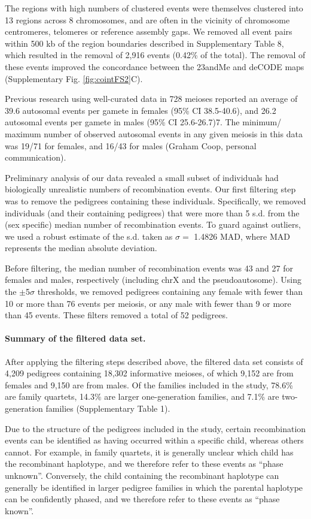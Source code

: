 The regions with high numbers of clustered events were themselves clustered
into 13 regions across 8 chromosomes, and are often in the vicinity of chromosome
centromeres, telomeres or reference assembly gaps. We removed all event pairs
within 500 kb of the region boundaries described in Supplementary Table 8, which
resulted in the removal of 2,916 events (0.42\% of the total). The removal of these
events improved the concordance between the 23andMe and deCODE maps
(Supplementary Fig. \ref{fig:cointFS2}C).

Previous research using well-curated data in 728 meioses reported an average of
39.6 autosomal events per gamete in females (95\% CI 38.5-40.6), and 26.2
autosomal events per gamete in males (95\% CI 25.6-26.7)7. The minimum/
maximum number of observed autosomal events in any given meiosis in this
data was 19/71 for females, and 16/43 for males (Graham Coop, personal
communication).

Preliminary analysis of our data revealed a small subset of individuals had
biologically unrealistic numbers of recombination events. Our first filtering step
was to remove the pedigrees containing these individuals. Specifically, we removed
individuals (and their containing pedigrees) that were more than 5 s.d. from the
(sex specific) median number of recombination events. To guard against outliers,
we used a robust estimate of the s.d. taken as $\sigma=$ 1.4826 MAD, where MAD
represents the median absolute deviation.

Before filtering, the median number of recombination events was 43 and 27 for
females and males, respectively (including chrX and the pseudoautosome). Using
the $\pm$5$\sigma$ thresholds, we removed pedigrees containing any female with fewer than
10 or more than 76 events per meiosis, or any male with fewer than 9 or more than
45 events. These filters removed a total of 52 pedigrees.

\paragraph{Summary of the filtered data set.} After applying the filtering steps described
above, the filtered data set consists of 4,209 pedigrees containing 18,302
informative meioses, of which 9,152 are from females and 9,150 are from males.
Of the families included in the study, 78.6\% are family quartets, 14.3\% are larger
one-generation families, and 7.1\% are two-generation families (Supplementary
Table 1).

Due to the structure of the pedigrees included in the study, certain
recombination events can be identified as having occurred within a specific child,
whereas others cannot. For example, in family quartets, it is generally unclear
which child has the recombinant haplotype, and we therefore refer to these events
as ``phase unknown''. Conversely, the child containing the recombinant haplotype
can generally be identified in larger pedigree families in which the parental
haplotype can be confidently phased, and we therefore refer to these events as
``phase known''.

